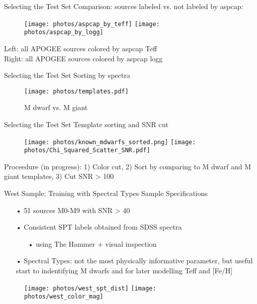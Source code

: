 \documentclass[compress]{beamer}
\begin{document}
\begin{frame}{Selecting the Test Set}
Comparison: sources labeled vs. not labeled by aspcap:
\begin{figure}
	\texttt{[image: photos/aspcap\_by\_teff]}  
	\texttt{[image: photos/aspcap\_by\_logg]}  
\end{figure}
\textcolor{sthlmDarkGreen}{Left}: all APOGEE sources colored by aspcap \textcolor{sthlmDarkGreen}{Teff} \\
\textcolor{sthlmDarkGreen}{Right}: all APOGEE sources colored by aspcap \textcolor{sthlmDarkGreen}{logg} 
\end{frame}


\begin{frame}{Selecting the Test Set}
Sorting by spectra
\begin{figure}
	\texttt{[image: photos/templates.pdf]} 
	\caption{M dwarf vs. M giant}
\end{figure}
\end{frame}


\begin{frame}{Selecting the Test Set}
Template sorting and SNR cut
\begin{figure}
	\texttt{[image: photos/known\_mdwarfs\_sorted.png]} 
	\texttt{[image: photos/Chi\_Squared\_Scatter\_SNR.pdf]} 
\end{figure}

\pause
Proceedure (in progress): 1) Color cut, 2) Sort by comparing to M dwarf and M giant templates, 3) Cut SNR > 100
\end{frame}


\begin{frame}{West Sample: Training with Spectral Types}
Sample Specifications
\begin{enumerate} \small
	\item[•] \textcolor{sthlmDarkGreen}{51 sources M0-M9} with SNR > 40
	\item[•] Consistent SPT labels obtained from SDSS spectra 
	\begin{enumerate} 
		\item[•] using The Hammer + visual inspection 
	\end{enumerate}
	\item[•] Spectral Types: not the most physically informative parameter, but useful start to indentifying M dwarfs and for later modelling Teff and [Fe/H]
\end{enumerate}


\begin{figure}
	\texttt{[image: photos/west\_spt\_dist]} 
	\texttt{[image: photos/west\_color\_mag]} 
\end{figure}
\end{frame}
\end{document}
